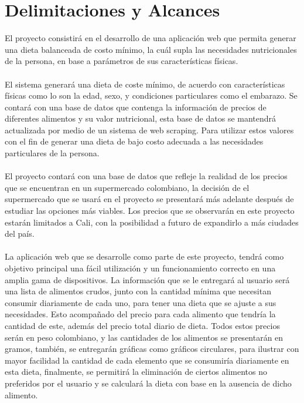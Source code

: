\section{Delimitaciones y Alcances}
\noindent El proyecto consistir\'a en el desarrollo de una aplicaci\'on web que permita generar una dieta balanceada de costo m\'inimo, la cu\'al supla las necesidades nutricionales de la persona, en base a par\'ametros de sus caracter\'isticas f\'isicas.
\\
\\
El sistema generar\'a una dieta de coste m\'inimo, de acuerdo con caracter\'isticas f\'isicas como lo son la edad, sexo, y condiciones particulares como el embarazo. Se contar\'a con una base de datos que contenga la informaci\'on de precios de diferentes alimentos y su valor nutricional, esta base de datos se mantendr\'a actualizada por medio de un sistema de web scraping. Para utilizar estos valores con el fin de generar una dieta de bajo costo adecuada a las necesidades particulares de la persona.
\\
\\
El proyecto contar\'a con una base de datos que refleje la realidad de los precios que se encuentran en un supermercado colombiano, la decisi\'on de el supermercado que se usar\'a en el proyecto se presentar\'a m\'as adelante despu\'es de estudiar las opciones m\'as viables. Los precios que se observar\'an en este proyecto estar\'an limitados a Cali, con la posibilidad a futuro de expandirlo a m\'as ciudades del pa\'is.
\\
\\
La aplicaci\'on web que se desarrolle como parte de este proyecto, tendr\'a como objetivo principal una f\'acil utilizaci\'on y un funcionamiento correcto en una amplia gama de dispositivos. La informaci\'on que se le entregar\'a al usuario ser\'a una lista de alimentos crudos, junto con la cantidad m\'inima que necesitan consumir diariamente de cada uno, para tener una dieta que se ajuste a sus necesidades. Esto acompa\~{n}ado del precio para cada alimento que tendr\'ia la cantidad de este, adem\'as del precio total diario de dieta. Todos estos precios ser\'an en peso colombiano, y las cantidades de los alimentos se presentar\'an en gramos, tambi\'en, se entregar\'an gr\'aficas como gr\'aficos circulares, para ilustrar con mayor facilidad la cantidad de cada elemento que se consumir\'ia diariamente en esta dieta, finalmente, se permitir\'a la eliminaci\'on de ciertos alimentos no preferidos por el usuario y se calcular\'a la dieta con base en la ausencia de dicho alimento.


